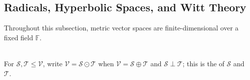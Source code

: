 \subsection{Radicals, Hyperbolic Spaces, and Witt Theory}

Throughout this subsection, metric vector spaces are finite-dimensional over a fixed field $\mathbb{F}$.

\begin{definition} \label{def:metric-orthogonal-direct-sum} \\
For $\mathcal{S},\mathcal{T}\leq\mathcal{V}$, write $\mathcal{V}=\mathcal{S}\odot\mathcal{T}$ when $\mathcal{V}=\mathcal{S}\oplus\mathcal{T}$ and $\mathcal{S}\perp\mathcal{T}$; this is the  of $\mathcal{S}$ and $\mathcal{T}$.
\end{definition}

